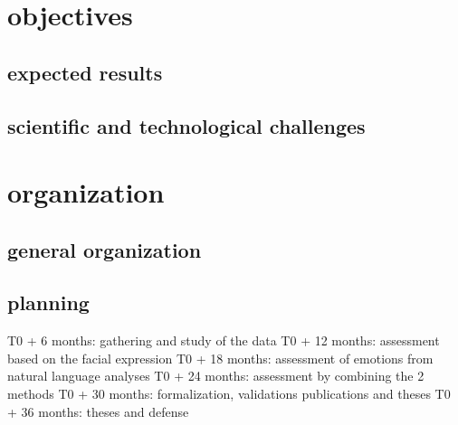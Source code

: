 \documentclass[11pt]{article}
\begin{document}
\section{objectives}
\label{sec:org82ceda9}
\subsection{expected results}
\label{sec:orgd3c0933}
\subsection{scientific and technological challenges}
\label{sec:orgd7deb1e}
\section{organization}
\label{sec:org2595ef6}
\subsection{general organization}
\label{sec:org3f74e21}
\subsection{planning}
\label{sec:org04ac87b}
T0 + 6  months: gathering and study of the data
T0 + 12 months: assessment based on the facial expression
T0 + 18 months: assessment of emotions from natural language analyses
T0 + 24 months: assessment by combining the 2 methods
T0 + 30 months: formalization, validations publications and theses
T0 + 36 months: theses and defense





\end{document}
